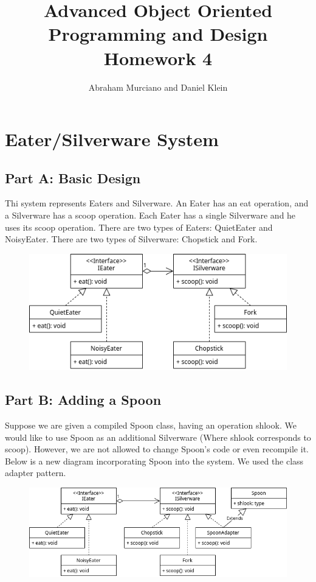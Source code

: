 \documentclass{article}
\title{Advanced Object Oriented Programming and Design\\
\medskip
\large Homework 4}
\author{Abraham Murciano and Daniel Klein}
\begin{document}
\maketitle

\section{Eater/Silverware System}

\subsection*{Part A: Basic Design}

Thi system represents Eaters and Silverware. An Eater has an eat operation, and a Silverware has a scoop operation. Each Eater has a single Silverware and he uses its scoop operation. There are two types of Eaters: QuietEater and NoisyEater. There are two types of Silverware: Chopstick and Fork.

\begin{figure}[ht]
	\includegraphics[width=\textwidth]{hw4q1a.png}
\end{figure}

\subsection*{Part B: Adding a Spoon}

Suppose we are given a compiled Spoon class, having an operation shlook. We would like to use Spoon as an additional Silverware (Where shlook corresponds to scoop). However, we are not allowed to change Spoon's code or even recompile it. Below is a new diagram incorporating Spoon into the system. We used the class adapter pattern.

\begin{figure}[ht]
	\includegraphics[width=\textwidth]{hw4q1b.png}
\end{figure}
\end{document}
